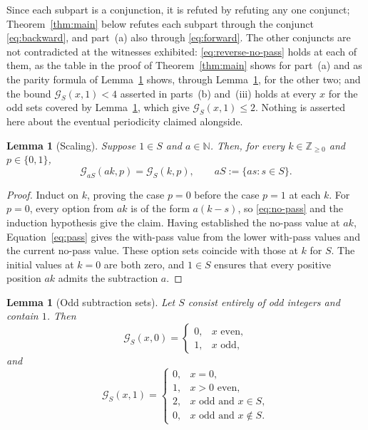 \documentclass[11pt]{amsart}
\newtheorem{lemma}[theorem]{Lemma}
\theoremstyle{remark}
\newcommand{\G}{\mathcal{G}}
\begin{document}
Since each subpart is a conjunction, it is refuted by refuting any one
conjunct; Theorem~\ref{thm:main} below refutes each subpart through the
conjunct \eqref{eq:backward}, and part~(a) also through
\eqref{eq:forward}. The other conjuncts are not contradicted at the
witnesses exhibited: \eqref{eq:reverse-no-pass} holds at each of them,
as the table in the proof of Theorem~\ref{thm:main} shows for part~(a)
and as the parity formula of Lemma~\ref{lem:odd} shows, through
Lemma~\ref{lem:scaling}, for the other two; and the bound
$\G_S(x,1)<4$ asserted in parts~(b) and~(iii) holds at every $x$ for
the odd sets covered by Lemma~\ref{lem:odd}, which give
$\G_S(x,1)\leq2$. Nothing is asserted here about the eventual
periodicity claimed alongside.

\begin{lemma}[Scaling]\label{lem:scaling}
Suppose $1\in S$ and $a\in\mathbb N$. Then, for every
$k\in\mathbb Z_{\geq0}$ and $p\in\{0,1\}$,
\[
\G_{aS}(ak,p)=\G_S(k,p),
\qquad
aS:=\{as:s\in S\}.
\]
\end{lemma}

\begin{proof}
Induct on $k$, proving the case $p=0$ before the case $p=1$ at each
$k$. For $p=0$, every option from $ak$ is of the form $a(k-s)$, so
\eqref{eq:no-pass} and the induction hypothesis give the claim.
Having established the no-pass value at $ak$, Equation~\eqref{eq:pass}
gives the with-pass value from the lower with-pass values and the
current no-pass value. These option sets coincide with those at $k$
for $S$. The initial values at $k=0$ are both zero, and $1\in S$
ensures that every positive position $ak$ admits the subtraction $a$.
\end{proof}

\begin{lemma}[Odd subtraction sets]\label{lem:odd}
Let $S$ consist entirely of odd integers and contain $1$. Then
\[
\G_S(x,0)=
\begin{cases}
0,&x\text{ even},\\
1,&x\text{ odd},
\end{cases}
\]
and
\[
\G_S(x,1)=
\begin{cases}
0,&x=0,\\
1,&x>0\text{ even},\\
2,&x\text{ odd and }x\in S,\\
0,&x\text{ odd and }x\notin S.
\end{cases}
\]
\end{lemma}
\end{document}
